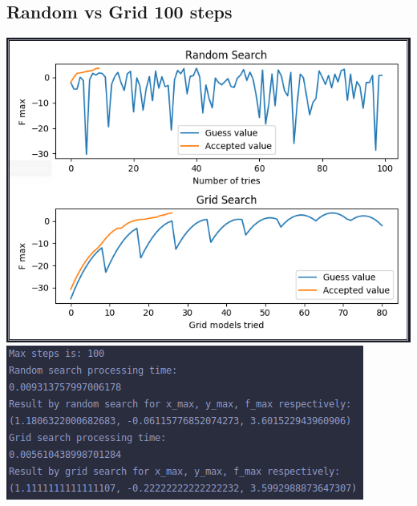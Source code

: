 \documentclass[12pt]{article}
\begin{document}
      \subsection*{Random vs Grid 100 steps}
        \begin{center}
          \includegraphics{../RandomVsGrid100Plot.png}
          \includegraphics{../RandomVsGrid100Result.png}
        \end{center}
\end{document}
